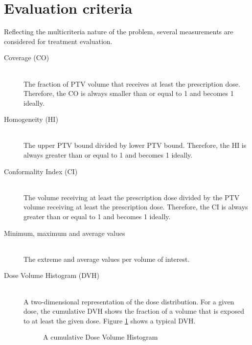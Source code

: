\documentclass[12pt]{article}
\begin{document}
\section{Evaluation criteria}
	Reflecting the multicriteria nature of the problem, several measurements are considered for treatment evaluation.
	\begin{description}
		\item[Coverage (CO)]~\\
			The fraction of PTV volume that receives at least the prescription dose. Therefore, the CO is always smaller than or equal to 1 and becomes 1 ideally.
		\item[Homogeneity (HI)]~\\
			The upper PTV bound divided by lower PTV bound. Therefore, the HI is always greater than or equal to 1 and becomes 1 ideally.
		\item[Conformality Index (CI)]~\\
			The volume receiving at least the prescription dose divided by the PTV volume receiving at least the prescription dose. Therefore, the CI is always greater than or equal to 1 and becomes 1 ideally.
		\item[Minimum, maximum and average values]~\\
			The extreme and average values per volume of interest.
		\item[Dose Volume Histogram (DVH)]~\\
			A two-dimensional representation of the dose distribution. For a given dose, the cumulative DVH shows the fraction of a volume that is exposed to at least the given dose. Figure \ref{fig:evalCritDVH} shows a typical DVH.
			\begin{figure}[ht]
				\centering
				 
				\caption{A cumulative Dose Volume Histogram}
				\label{fig:evalCritDVH}
			\end{figure}
			


\end{description}	
\end{document}
